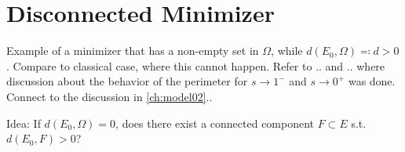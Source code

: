 \chapter{Disconnected Minimizer}
\label{ch:connected_minimizer}

Example of a minimizer that has a non-empty set in \( \Omega \), while \( d(E_{0},
\Omega) \eqqcolon d > 0  \).\newline
Compare to classical case, where this cannot happen. Refer to .. and .. where discussion
about the behavior of the perimeter for \( s \to 1^{-}  \) and \( s \to  0^{+}  \) was
done. \newline
Connect to the discussion in \cref{ch:model02}..\newline



Idea: If \( d(E_{0}, \Omega ) = 0  \), does there exist a connected component \( F \subset
E \) s.t.\ \( d(E_{0}, F) > 0 \)?  